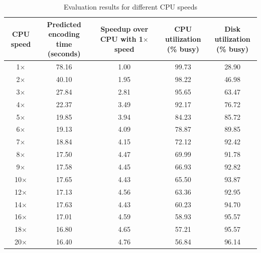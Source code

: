 \begin{table}[htbp]%
	\small
	\centering
	\caption{Evaluation results for different CPU speeds}\label{tab:ch5-encoding-time}
	\noindent\begin{tabular}{ccccc}
		\toprule
		\parbox{2cm}{\centering CPU speed} & \parbox{3cm}{\centering Predicted encoding \\ time (seconds)} & \parbox{3cm}{\centering Speedup over \\ CPU with 1$\times$ speed} & \parbox{3cm}{\centering CPU utilization \\ (\% busy)} & \parbox{2.5cm}{\centering Disk utilization \\ (\% busy)} \\
		\midrule
		
		1$\times$ & 78.16 & 1.00 & 99.73 & 28.90 \\
		2$\times$ & 40.10 & 1.95 & 98.22 & 46.98 \\
		3$\times$ & 27.84 & 2.81 & 95.65 & 63.47 \\
		4$\times$ & 22.37 & 3.49 & 92.17 & 76.72 \\
		5$\times$ & 19.85 & 3.94 & 84.23 & 85.72 \\
		6$\times$ & 19.13 & 4.09 & 78.87 & 89.85 \\
		7$\times$ & 18.84 & 4.15 & 72.12 & 92.42 \\
		8$\times$ & 17.50 & 4.47 & 69.99 & 91.78 \\
		9$\times$ & 17.58 & 4.45 & 66.93 & 92.82 \\
		10$\times$ & 17.65 & 4.43 & 65.50 & 93.87 \\
		12$\times$ & 17.13 & 4.56 & 63.36 & 92.95 \\
		14$\times$ & 17.63 & 4.43 & 60.23 & 94.70 \\
		16$\times$ & 17.01 & 4.59 & 58.93 & 95.57 \\
		18$\times$ & 16.80 & 4.65 & 57.21 & 95.57 \\
		20$\times$ & 16.40 & 4.76 & 56.84 & 96.14 \\
		
		\bottomrule
	\end{tabular}
\end{table}%

